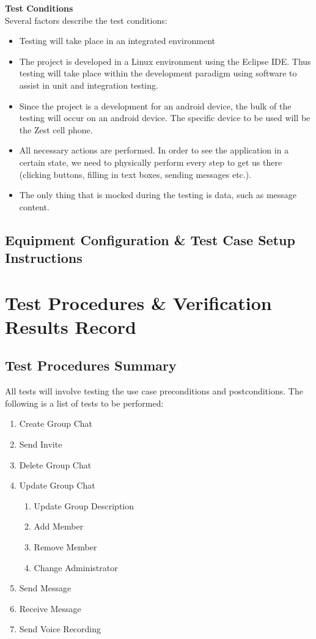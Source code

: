 \documentclass[11pt]{article}
\begin{document}
\textbf{Test Conditions}\\
Several factors describe the test conditions:
\begin{itemize}
\item Testing will take place in an integrated environment
\item The project is developed in a Linux environment using the Eclipse IDE. Thus testing will take place within the development paradigm using software to assist in unit and integration testing.
\item Since the project is a development for an android device, the bulk of the testing will occur on an android device. The specific device to be used will be the Zest cell phone.
\item All necessary actions are performed. In order to see the application in a certain state, we need to physically perform every step to get us there (clicking buttons, filling in text boxes, sending messages etc.).
\item The only thing that is mocked during the testing is data, such as message content.
\end{itemize}



\subsection{Equipment Configuration \& Test Case Setup Instructions}


\section{Test Procedures \& Verification Results Record}
\subsection{Test Procedures Summary}
All tests will involve testing the use case preconditions and postconditions.
The following is a list of tests to be performed:
\begin{enumerate}
\item Create Group Chat
\item Send Invite
\item Delete Group Chat
\item Update Group Chat
\begin{enumerate}
\item Update Group Description
\item Add Member
\item Remove Member
\item Change Administrator 
\end{enumerate}
\item Send Message
\item Receive Message
\item Send Voice Recording
\end{enumerate}
\end{document}

